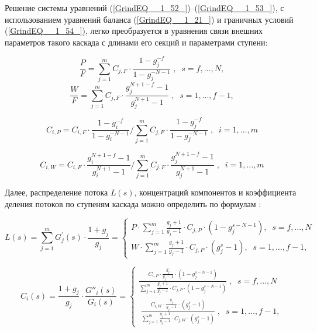 Решение системы уравнений (\ref{GrindEQ__1_52_})--(\ref{GrindEQ__1_53_}), с использованием уравнений баланса (\ref{GrindEQ__1_21_}) и граничных условий (\ref{GrindEQ__1_54_}), легко преобразуется в уравнения связи внешних параметров такого каскада с длинами его секций и параметрами ступени:

\begin{equation} \label{GrindEQ__1_55_} 
  \frac{P}{F} =\sum _{j=1}^{m}C_{j,F} \cdot \frac{1-g_{j}^{-f} }{1-g_{j}^{-N-1}} \; ,\; \; s=f,...,N ,                                                  
  \end{equation} 
  \begin{equation} \label{GrindEQ__1_56_} 
  \frac{W}{F} =\sum _{j=1}^{m}C_{j,F} \cdot \frac{g_{j}^{N+1-f} -1}{g_{j}^{N+1} -1} \; ,\; \; s=1,...,f-1 ,                                            
\end{equation}

\begin{equation} \label{GrindEQ__1_57_} 
  C_{i,P}=C_{i,F} \cdot \frac{1-g_{i}^{-f}}{1-g_{i}^{-N-1}} / \sum_{j=1}^{m} C_{j,F} \cdot \frac{1-g_{j}^{-f}}{1-g_{j}^{-N-1}}\; ,\; \;  i=1, \ldots, m                             
\end{equation}

\begin{equation} \label{GrindEQ__1_58_} 
  C_{i,W}=C_{i,F} \cdot \frac{g_{i}^{N+1-f}-1}{g_{i}^{N+1}-1} / \sum_{j=1}^{m} C_{j,F} \cdot \frac{g_{j}^{N+1-f}-1}{g_{j}^{N+1}-1}\; ,\; \;  i=1, \ldots, m                         
\end{equation} 

Далее, распределение потока $L(s)$, концентраций компонентов и коэффициента деления потоков по ступеням каскада можно определить по формулам \cite{sulaberidzeTeoriyaKaskadovDlya2011}:

\begin{equation} \label{GrindEQ__1_59_} 
  L(s)=\sum_{j=1}^{m} G_{j}^{\prime}(s) \cdot \frac{1+g_{j}}{g_{j}}=\left\{\begin{array}{c}
  P \cdot \sum_{j=1}^{m} \frac{g_{j}+1}{g_{j}-1} \cdot C_{j,P} \cdot \left(1-g_{j}^{s-N-1}\right)  ,\; \;  s=f, \ldots, N \\
  W \cdot \sum_{j=1}^{m} \frac{g_{j}+1}{g_{j}-1} \cdot C_{j,P} \cdot \left(g_{j}^{s}-1\right) ,\; \;  s=1, \ldots, f-1,
  \end{array}\right.
\end{equation} 

\begin{equation} \label{GrindEQ__1_60_} 
  C_{i} (s)=\frac{1+g_{j} }{g_{j} } \cdot \frac{G''_{i} (s)}{G_{i} (s)} =\left\{\begin{array}{l} {\frac{C_{i,P}\cdot \frac{g_{j} }{g_{j} -1}\cdot \left(1-g_{j}^{s-N-1} \right)}{\sum _{j=1}^{m}\frac{g_{j} +1}{g_{j} -1} \cdot C_{j,P} \cdot \left(1-g_{j}^{s-N-1} \right)} \; ,\; \; s=f,...,N} \\ {\; \frac{C_{i,W} \cdot \frac{g_{j} }{g_{j} -1} \cdot \left(g_{j}^{s} -1\right)}{\sum _{j=1}^{m}\frac{g_{j} +1}{g_{j} -1} \cdot C_{j,W} \cdot \left(g_{j}^{s} -1\right)} \; ,\; \; s=1,...,f-1,} \end{array}\right.  
\end{equation} 

